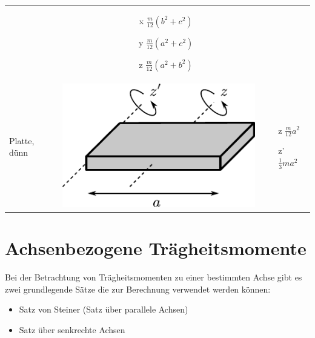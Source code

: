 \begin{table}[h!]
\begin{tabular}{m{2cm} c m{}}
\begin{minipage}{0.3\textwidth}
	\end{minipage} &
		\begin{itemize}
		\item[x] $\frac{m}{12} \left(b^2 + c^2\right)$
		\item[y] $\frac{m}{12} \left(a^2 + c^2\right)$
		\item[z] $\frac{m}{12} \left(a^2 + b^2\right)$
		\end{itemize} \\
Platte, dünn &
	\begin{minipage}{0.3\textwidth}
	\includegraphics[scale=\traegscale]{traeg-platte.pdf}
	\end{minipage} &
		\begin{itemize}
		\item[z] $\frac{m}{12} a^2$
		\item[z'] $\frac{1}{3} ma^2$
		\end{itemize} \\
\end{tabular}
\end{table}

\newpage
\section{Achsenbezogene Trägheitsmomente}
Bei der Betrachtung von Trägheitsmomenten zu einer bestimmten Achse gibt 
es zwei grundlegende Sätze die zur Berechnung verwendet werden können:

\begin{itemize}
	\item Satz von Steiner (Satz über parallele Achsen)
	\item Satz über senkrechte Achsen
\end{itemize}

